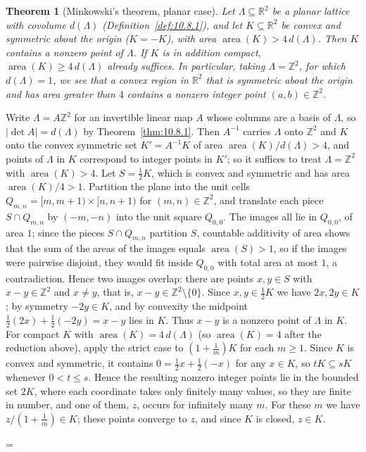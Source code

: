\documentclass[11pt]{article}
\makeatletter
\theoremstyle{ntstyle}
\newtheorem{theorem}{Theorem}[subsection]
\let\nt@closedisplay\]
\def\nt@guardedclose{\@ifnextchar\par{\nt@closeafterpar}{\@ifnextchar\end{\postdisplaypenalty\@M\nt@closedisplay}{\nt@closedisplay}}}
\def\nt@closeafterpar\par{\@ifnextchar\par{\nt@closeafterpar}{\@ifnextchar\end{\postdisplaypenalty\@M\nt@closedisplay\par}{\nt@closedisplay\par}}}
\renewenvironment{proof}[1][\proofname]{\par
  \pushQED{\qed}\normalfont\topsep\medskipamount\edef\nt@afterproof{\@endparpenalty=\the\@endparpenalty\relax}\@beginparpenalty\@M\@endparpenalty\@M\let\]\nt@guardedclose\trivlist\item[]\textit{#1\@addpunct{.}} \ignorespaces}{\ifvmode\addpenalty\@M\fi\popQED\nt@afterproof\endtrivlist\@endpefalse}
\DeclareMathOperator{\area}{area}
\makeatother
\begin{document}
\begin{theorem}[Minkowski's theorem, planar case]\label{thm:10.11.1} Let
	$\Lambda\subseteq\mathbb{R}^2$ be a planar lattice with covolume
	$d(\Lambda)$ (Definition~\ref{def:10.8.1}), and let $K\subseteq\mathbb{R}^2$
	be convex and symmetric about the origin ($K=-K$), with area
	$\area(K)>4\,d(\Lambda)$. Then $K$ contains a nonzero
	point of $\Lambda$. If $K$ is in addition compact,
	$\area(K)\ge 4\,d(\Lambda)$ already suffices. In particular, taking
	$\Lambda=\mathbb{Z}^2$, for which $d(\Lambda)=1$, we see that a convex region in
	$\mathbb{R}^2$ that is symmetric about the origin and has area greater than $4$
	contains a nonzero integer point $(a,b)\in\mathbb{Z}^2$.

\end{theorem}

\begin{proof} Write $\Lambda=A\mathbb{Z}^2$ for an
	invertible linear map $A$ whose columns are a basis of $\Lambda$, so
	$|\det A|=d(\Lambda)$ by Theorem~\ref{thm:10.8.1}. Then $A^{-1}$ carries $\Lambda$ onto
	$\mathbb{Z}^2$ and $K$ onto the convex symmetric set $K'=A^{-1}K$ of
	area $\area(K)/d(\Lambda)>4$, and points of $\Lambda$
	in $K$ correspond to integer points in $K'$; so it suffices to treat
	$\Lambda=\mathbb{Z}^2$ with $\area(K)>4$. Let
	$S=\tfrac{1}{2}K$, which is convex and symmetric and has area
	$\area(K)/4>1$. Partition the plane into the unit cells
	$Q_{m,n}=[m,m+1)\times[n,n+1)$ for $(m,n)\in\mathbb{Z}^2$, and
	translate each piece $S\cap Q_{m,n}$ by $(-m,-n)$ into the unit
	square $Q_{0,0}$. The images all lie in $Q_{0,0}$, of area $1$; since the pieces $S\cap Q_{m,n}$ partition $S$, countable additivity of area shows that the sum of the areas of the images equals $\area(S)>1$, so if the images were pairwise disjoint, they would fit inside $Q_{0,0}$ with total area at most $1$, a contradiction. Hence two images overlap:
	there are points $x,y\in S$ with $x-y\in\mathbb{Z}^2$ and $x\neq y$,
	that is, $x-y\in\mathbb{Z}^2\setminus\{0\}$. Since $x,y\in\tfrac{1}{2}K$ we
	have $2x,2y\in K$; by symmetry $-2y\in K$, and by convexity the
	midpoint $\tfrac{1}{2}(2x)+\tfrac{1}{2}(-2y)=x-y$ lies in $K$. Thus $x-y$ is
	a nonzero point of $\Lambda$ in $K$. For compact $K$ with
	$\area(K)=4\,d(\Lambda)$ (so $\area(K)=4$ after the reduction above), apply the strict case to
	$(1+\tfrac{1}{m})K$ for each $m\ge1$. Since $K$ is convex and symmetric,
	it contains $0=\tfrac12x+\tfrac12(-x)$ for any $x\in K$, so $tK\subseteq sK$
	whenever $0<t\le s$. Hence the resulting nonzero integer points lie in the
	bounded set $2K$, where each coordinate takes only finitely many values,
	so they are finite in number, and one of them, $z$, occurs for infinitely
	many $m$. For these $m$ we have $z/(1+\tfrac{1}{m})\in K$; these points
	converge to $z$, and since $K$ is closed, $z\in K$.

\end{proof}
\clearpage
\end{document}
